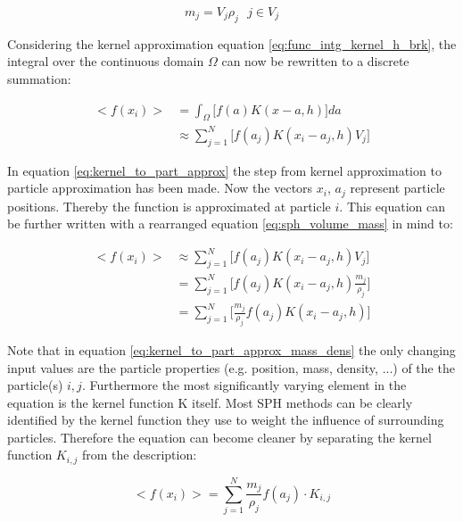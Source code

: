\begin{equation} \label{eq:sph_volume_mass}
m_{j} = V_{j}\rho_{j} \ \ \ j \in V_{j}
\end{equation}

Considering the kernel approximation equation \ref{eq:func_intg_kernel_h_brk}, the integral over the continuous domain $\Omega$ can now be rewritten to a discrete summation:

\begin{equation} 
\label{eq:kernel_to_part_approx}
\begin{split}
< f(x_{i}) > 
&= \int_{\Omega} \biggl [ f(a) K(x-a, h) \biggr ] d a \\
&\approx    \sum_{j=1}^{N} \biggl [ f(a_{j}) K(x_{i}-a_{j}, h) V_{j} \biggr ]
\end{split}
\end{equation}

In equation \ref{eq:kernel_to_part_approx} the step from kernel approximation to particle approximation has been made. Now the vectors $x_{i}$, $a_{j}$ represent particle positions. Thereby the function is approximated at particle $i$. This equation can be further written with a rearranged equation \ref{eq:sph_volume_mass} in mind to:

\begin{equation} 
\label{eq:kernel_to_part_approx_mass_dens}
\begin{split}
< f(x_{i}) > 
&\approx    \sum_{j=1}^{N} \biggl [ f(a_{j}) K(x_{i}-a_{j}, h) V_{j} \biggr ] \\
&=          \sum_{j=1}^{N} \biggl [ f(a_{j}) K(x_{i}-a_{j}, h) \frac{m_{j}}{\rho_{j}} \biggr ] \\
&=          \sum_{j=1}^{N} \biggl [ \frac{m_{j}}{\rho_{j}}  f(a_{j}) K(x_{i}-a_{j}, h) \biggr ] 
\end{split}
\end{equation}

Note that in equation \ref{eq:kernel_to_part_approx_mass_dens} the only changing input values are the particle properties (e.g. position, mass, density, ...) of the  the particle(s) $i,j$. Furthermore the most significantly varying element in the equation is the kernel function K itself. Most SPH methods can be clearly identified by the kernel function they use to weight the influence of surrounding particles. Therefore the equation can become cleaner by separating the kernel function $K_{i,j}$ 
from the description:

\begin{equation} 
\label{eq:kernel_to_part_clean}
< f(x_{i}) > =
\sum_{j=1}^{N} \frac{m_{j}}{\rho_{j}}  f(a_{j}) \cdot K_{i,j}
\end{equation}

